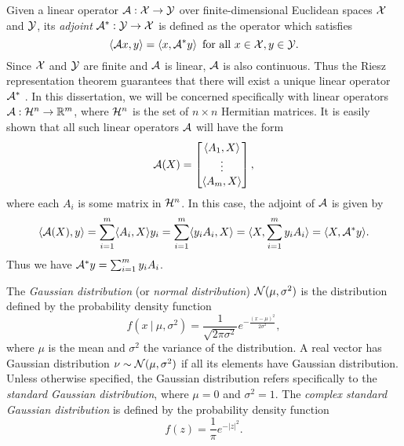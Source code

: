 Given a linear operator ${\mathcal A} : {\mathcal X} \rightarrow {\mathcal Y}$ over finite-dimensional Euclidean spaces ${\mathcal X}$ and ${\mathcal Y}$, its \textit{adjoint} ${\mathcal A}^* : {\mathcal Y} \rightarrow {\mathcal X}$ is defined as the operator which satisfies 
\begin{equation}			\label{Def:adjoint_operator}
\langle {\mathcal A} x, y \rangle = \langle x, {\mathcal A}^* y \rangle \hspace{5pt} \text{for all } x \in {\mathcal X}, y \in {\mathcal Y}. 
\end{equation} 
Since ${\mathcal X}$ and ${\mathcal Y}$ are finite and ${\mathcal A}$ is linear, ${\mathcal A}$ is also continuous.  Thus the Riesz representation theorem guarantees that there will exist a unique linear operator ${\mathcal A}^*$ \cite[Section 6.2]{reed1980functional}.  In this dissertation, we will be concerned specifically with linear operators ${\mathcal A}: {\mathcal H}^n \rightarrow {\mathbb R}^m$, where ${\mathcal H}^n$ is the set of $n \times n$ Hermitian matrices.  It is easily shown that all such linear operators ${\mathcal A}$ will have the form
\begin{equation}
{\mathcal A}(X) = \begin{bmatrix}
\langle A_1, X \rangle	\\
\vdots	\\
\langle A_m, X \rangle
\end{bmatrix},
\end{equation}
where each $A_i$ is some matrix in ${\mathcal H}^n$.  In this case, the adjoint of ${\mathcal A}$ is given by 
\begin{equation}
\langle {\mathcal A}(X), y \rangle  	= \sum_{i=1}^m \langle A_i, X \rangle y_i	  = \sum_{i=1}^m \langle y_iA_i, X \rangle   = \langle X, \sum_{i=1}^m  y_iA_i \rangle = \langle X, {\mathcal A}^*y \rangle.
\end{equation}
Thus we have ${\mathcal A}^*y = \sum_{i=1}^m  y_iA_i$.


The \textit{Gaussian distribution} (or \textit{normal distribution}) ${\mathcal N}(\mu, \sigma^2)$ is the distribution defined by the probability density function
\begin{equation} 			\label{Def:Gaussian_distribution}
f\left(x \ | \ \mu, \sigma^2\right) = \frac{1}{\sqrt{2\pi \sigma^2}}e^{-\frac{(x-\mu)^2}{2\sigma^2}},
\end{equation}
where $\mu$ is the mean and $\sigma^2$ the variance of the distribution.  A real vector has Gaussian distribution $\nu \sim {\mathcal N}(\mu, \sigma^2)$ if all its elements have Gaussian distribution.  Unless otherwise specified, the Gaussian distribution refers specifically to the \textit{standard Gaussian distribution}, where $\mu = 0$ and $\sigma^2 = 1$.  The \textit{complex standard Gaussian distribution} is defined by the probability density function
\begin{equation} 			\label{Def:Gaussian_distribution_complex}
f(z) = \frac{1}{\pi}e^{-|z|^2}.
\end{equation}



